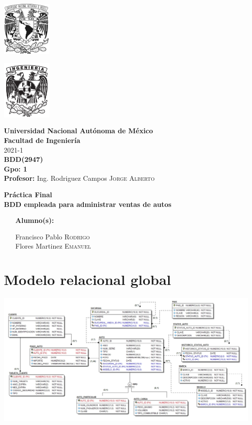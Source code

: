\documentclass{article}
\newcommand{\coverPage}{
\thispagestyle{empty}
  \begin{minipage}[t][5cm][t]{0.2\linewidth}
    \includegraphics[width=2.5cm]{unam.jpg}

    \vspace{10cm}

    \includegraphics[width=2.5cm]{fiblack}
  \end{minipage}
  \begin{minipage}[t]{0.7\linewidth}
    \vspace{-2.5cm}
    \LARGE{\textbf{\university}}\\
    \Large{\textbf{\faculty}} \\
  
    \large{\semestre}\\[2cm]
  
    \large{\textbf{\materia (\clave)}}\\
    \large{\textbf{Gpo: \grupo}}\\[5mm]
    \large{\textbf{Profesor:} \profesor}\\ [1.5cm]
    \begin{center}
        \LARGE{\textbf{\actividad}}\\
        \LARGE{\textbf{\titulo}}\\
    \end{center}
  
    \vspace{3.3cm}
  
    \large{
      \begin{itemize}[ noitemsep, align=left ]
        \item [\textbf{Alumno(s):}] 
          \begin{flushright}
            \alumno
          \end{flushright}
      \end{itemize}
    } \vspace{1.5cm}
  
    \begin{flushright}
        \fechaEntrega%
    \end{flushright}
  \end{minipage}

\newpage
}
\begin{document}

\newcommand{\university}{Universidad Nacional Autónoma de México}
\newcommand{\faculty}{Facultad de Ingeniería}
\newcommand{\semestre}{2021-1}
\newcommand{\materia}{BDD}
\newcommand{\clave}{2947}
\newcommand{\grupo}{1}
\newcommand{\profesor}{Ing. Rodriguez Campos \textsc{Jorge Alberto}}

\newcommand{\alumno}{
  Francisco Pablo \textsc{Rodrigo} \\ 
  Flores Martinez \textsc{Emanuel}   
}
\newcommand{\actividad}{Práctica Final}
\newcommand{\titulo}{BDD empleada para administrar ventas de autos}

\newcommand{\fechaEntrega}{}

\newcommand{\codedir}{codigo}
\graphicspath{{assets/}{bdd_proyecto.assets/}}

\coverPage%



\section*{Modelo relacional global}

\includegraphics[width=\linewidth]{modelo}\\

\end{document}
